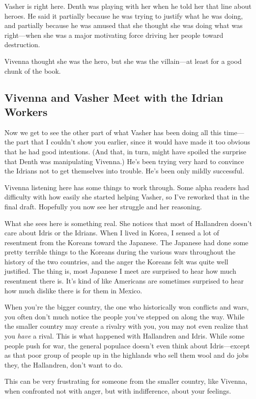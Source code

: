 Vasher is right here. Denth was playing with her when he told her that line about heroes. He said it partially because he was trying to justify what he was doing, and partially because he was amused that she thought she was doing what was right—when she was a major motivating force driving her people toward destruction.

Vivenna thought she was the hero, but she was the villain—at least for a good chunk of the book.

\subsection*{Vivenna and Vasher Meet with the Idrian Workers}

Now we get to see the other part of what Vasher has been doing all this time—the part that I couldn’t show you earlier, since it would have made it too obvious that he had good intentions. (And that, in turn, might have spoiled the surprise that Denth was manipulating Vivenna.) He’s been trying very hard to convince the Idrians not to get themselves into trouble. He’s been only mildly successful.

Vivenna listening here has some things to work through. Some alpha readers had difficulty with how easily she started helping Vasher, so I’ve reworked that in the final draft. Hopefully you now see her struggle and her reasoning.

What she sees here is something real. She notices that most of Hallandren doesn’t care about Idris or the Idrians. When I lived in Korea, I sensed a lot of resentment from the Koreans toward the Japanese. The Japanese had done some pretty terrible things to the Koreans during the various wars throughout the history of the two countries, and the anger the Koreans felt was quite well justified. The thing is, most Japanese I meet are surprised to hear how much resentment there is. It’s kind of like Americans are sometimes surprised to hear how much dislike there is for them in Mexico.

When you’re the bigger country, the one who historically won conflicts and wars, you often don’t much notice the people you’ve stepped on along the way. While the smaller country may create a rivalry with you, you may not even realize that you \textit{have} a rival. This is what happened with Hallandren and Idris. While some people push for war, the general populace doesn’t even think about Idris—except as that poor group of people up in the highlands who sell them wool and do jobs they, the Hallandren, don’t want to do.

This can be very frustrating for someone from the smaller country, like Vivenna, when confronted not with anger, but with indifference, about your feelings.



